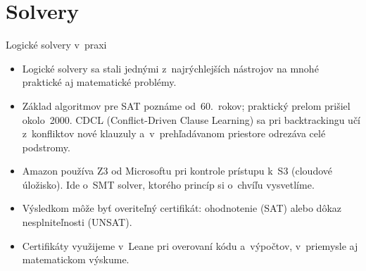 \documentclass[12pt]{beamer}
\begin{document}
\section{Solvery}
\begin{frame}{Logické solvery v~praxi}
  \begin{itemize}
    \item Logické solvery sa stali jednými z~najrýchlejších nástrojov
      na mnohé praktické aj matematické problémy.
    \item Základ algoritmov pre SAT poznáme od~60.~rokov;
      praktický prelom prišiel okolo~2000. CDCL (Conflict-Driven Clause Learning) sa pri backtrackingu
      učí z~konfliktov nové klauzuly a~v~prehľadávanom priestore odrezáva celé podstromy.
    \item Amazon používa Z3 od Microsoftu pri kontrole prístupu
      k~S3 (cloudové úložisko). Ide o~SMT solver, ktorého princíp si o~chvíľu vysvetlíme.
    \item Výsledkom môže byť overiteľný certifikát: ohodnotenie (SAT)
      alebo dôkaz nesplniteľnosti (UNSAT).
    \item Certifikáty využijeme v~Leane pri overovaní kódu a~výpočtov,
      v~priemysle aj matematickom výskume.
  \end{itemize}
\end{frame}

\end{document}
